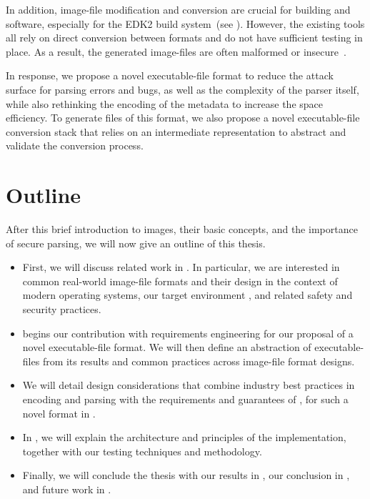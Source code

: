 In addition, \gls{image-file} modification and conversion are crucial for building  and  software, especially for the \gls{EDK2} build system~(see ). However, the existing tools all rely on direct conversion between formats and do not have sufficient testing in place. As a result, the generated \glspl{image-file} are often malformed or insecure~\cite{gnu-efi-fix,ipxe-fix}.

In response, we propose a novel \gls{executable-file} format to reduce the attack surface for parsing errors and bugs, as well as the complexity of the parser itself, while also rethinking the encoding of the metadata to increase the space efficiency. To generate files of this format, we also propose a novel \gls{executable-file} conversion stack that relies on an intermediate representation to abstract and validate the conversion process.

\section{Outline}

After this brief introduction to \glspl{image}, their basic concepts, and the importance of secure parsing, we will now give an outline of this thesis.

\begin{itemize}
  \item First, we will discuss related work in . In particular, we are interested in common real-world \gls{image-file} formats and their design in the context of modern operating systems, our target environment , and related safety and security practices.
  \item {} begins our contribution with requirements engineering for our proposal of a novel  \gls{executable-file} format. We will then define an abstraction of  \glspl{executable-file} from its results and common practices across \gls{image-file} format designs.
  \item We will detail design considerations that combine industry best practices in encoding and parsing with the requirements and guarantees of , for such a novel format in .
  \item In , we will explain the architecture and principles of the implementation, together with our testing techniques and methodology.
  \item Finally, we will conclude the thesis with our results in , our conclusion in , and future work in .
\end{itemize}

